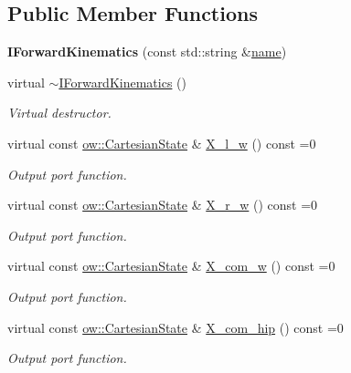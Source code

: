 \subsection*{Public Member Functions}
\begin{DoxyCompactItemize}
\item 
{\bfseries I\+Forward\+Kinematics} (const std\+::string \&\hyperlink{classow_1_1GenericModuleBase_a4b712883728cdbab7779e27f9a23689c}{name})\hypertarget{classow_1_1IForwardKinematics_ae2f9db63dcaa586e6b193ad93aaa5a52}{}\label{classow_1_1IForwardKinematics_ae2f9db63dcaa586e6b193ad93aaa5a52}

\item 
virtual \hyperlink{classow_1_1IForwardKinematics_ad55ac3be63c2cf2b69545435b802add4}{$\sim$\+I\+Forward\+Kinematics} ()\hypertarget{classow_1_1IForwardKinematics_ad55ac3be63c2cf2b69545435b802add4}{}\label{classow_1_1IForwardKinematics_ad55ac3be63c2cf2b69545435b802add4}

\begin{DoxyCompactList}\small\item\em Virtual destructor. \end{DoxyCompactList}\item 
virtual const \hyperlink{classow__core_1_1CartesianState}{ow\+::\+Cartesian\+State} \& \hyperlink{classow_1_1IForwardKinematics_a6f81fb63ee97ac3a815b5d809c4f24c1}{X\+\_\+l\+\_\+w} () const =0
\begin{DoxyCompactList}\small\item\em Output port function. \end{DoxyCompactList}\item 
virtual const \hyperlink{classow__core_1_1CartesianState}{ow\+::\+Cartesian\+State} \& \hyperlink{classow_1_1IForwardKinematics_a60a7e6cda62d99bd05c16b771b4126ff}{X\+\_\+r\+\_\+w} () const =0
\begin{DoxyCompactList}\small\item\em Output port function. \end{DoxyCompactList}\item 
virtual const \hyperlink{classow__core_1_1CartesianState}{ow\+::\+Cartesian\+State} \& \hyperlink{classow_1_1IForwardKinematics_a3d62099541f56622d30343ff466ce4e8}{X\+\_\+com\+\_\+w} () const =0
\begin{DoxyCompactList}\small\item\em Output port function. \end{DoxyCompactList}\item 
virtual const \hyperlink{classow__core_1_1CartesianState}{ow\+::\+Cartesian\+State} \& \hyperlink{classow_1_1IForwardKinematics_aff25a124e9fb04c5711b0d36c93a2393}{X\+\_\+com\+\_\+hip} () const =0
\begin{DoxyCompactList}\small\item\em Output port function. \end{DoxyCompactList}\end{DoxyCompactItemize}

